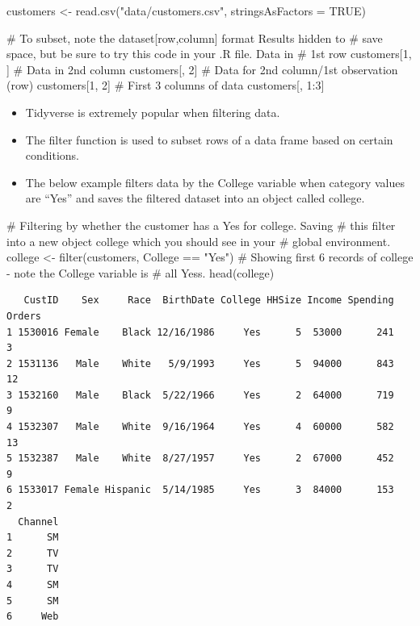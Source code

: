 \documentclass[
  letterpaper,
  DIV=11,
  numbers=noendperiod]{scrreprt}
\newenvironment{Shaded}{\begin{snugshade}}{\end{snugshade}}
\newcommand{\AttributeTok}[1]{\textcolor[rgb]{0.40,0.45,0.13}{#1}}
\newcommand{\CommentTok}[1]{\textcolor[rgb]{0.37,0.37,0.37}{#1}}
\newcommand{\ConstantTok}[1]{\textcolor[rgb]{0.56,0.35,0.01}{#1}}
\newcommand{\DecValTok}[1]{\textcolor[rgb]{0.68,0.00,0.00}{#1}}
\newcommand{\FunctionTok}[1]{\textcolor[rgb]{0.28,0.35,0.67}{#1}}
\newcommand{\NormalTok}[1]{\textcolor[rgb]{0.00,0.23,0.31}{#1}}
\newcommand{\OtherTok}[1]{\textcolor[rgb]{0.00,0.23,0.31}{#1}}
\newcommand{\SpecialCharTok}[1]{\textcolor[rgb]{0.37,0.37,0.37}{#1}}
\newcommand{\StringTok}[1]{\textcolor[rgb]{0.13,0.47,0.30}{#1}}
\providecommand{\tightlist}{%
  \setlength{\itemsep}{0pt}\setlength{\parskip}{0pt}}\usepackage{longtable,booktabs,array}
\begin{document}
\begin{Shaded}
\begin{Highlighting}[]
\NormalTok{customers }\OtherTok{\textless{}{-}} \FunctionTok{read.csv}\NormalTok{(}\StringTok{"data/customers.csv"}\NormalTok{, }\AttributeTok{stringsAsFactors =} \ConstantTok{TRUE}\NormalTok{)}

\CommentTok{\# To subset, note the dataset[row,column] format Results hidden to}
\CommentTok{\# save space, but be sure to try this code in your .R file.  Data in}
\CommentTok{\# 1st row}
\NormalTok{customers[}\DecValTok{1}\NormalTok{, ]}
\CommentTok{\# Data in 2nd column}
\NormalTok{customers[, }\DecValTok{2}\NormalTok{]}
\CommentTok{\# Data for 2nd column/1st observation (row)}
\NormalTok{customers[}\DecValTok{1}\NormalTok{, }\DecValTok{2}\NormalTok{]}
\CommentTok{\# First 3 columns of data}
\NormalTok{customers[, }\DecValTok{1}\SpecialCharTok{:}\DecValTok{3}\NormalTok{]}
\end{Highlighting}
\end{Shaded}

\begin{itemize}
\tightlist
\item
  Tidyverse is extremely popular when filtering data.
\item
  The filter function is used to subset rows of a data frame based on
  certain conditions.
\item
  The below example filters data by the College variable when category
  values are ``Yes'' and saves the filtered dataset into an object
  called college.
\end{itemize}

\begin{Shaded}
\begin{Highlighting}[]
\CommentTok{\# Filtering by whether the customer has a \textquotesingle{}Yes\textquotesingle{} for college.  Saving}
\CommentTok{\# this filter into a new object college which you should see in your}
\CommentTok{\# global environment.}
\NormalTok{college }\OtherTok{\textless{}{-}} \FunctionTok{filter}\NormalTok{(customers, College }\SpecialCharTok{==} \StringTok{"Yes"}\NormalTok{)}
\CommentTok{\# Showing first 6 records of college {-} note the College variable is}
\CommentTok{\# all Yes\textquotesingle{}s.}
\FunctionTok{head}\NormalTok{(college)}
\end{Highlighting}
\end{Shaded}

\begin{verbatim}
   CustID    Sex     Race  BirthDate College HHSize Income Spending Orders
1 1530016 Female    Black 12/16/1986     Yes      5  53000      241      3
2 1531136   Male    White   5/9/1993     Yes      5  94000      843     12
3 1532160   Male    Black  5/22/1966     Yes      2  64000      719      9
4 1532307   Male    White  9/16/1964     Yes      4  60000      582     13
5 1532387   Male    White  8/27/1957     Yes      2  67000      452      9
6 1533017 Female Hispanic  5/14/1985     Yes      3  84000      153      2
  Channel
1      SM
2      TV
3      TV
4      SM
5      SM
6     Web
\end{verbatim}
\end{document}
